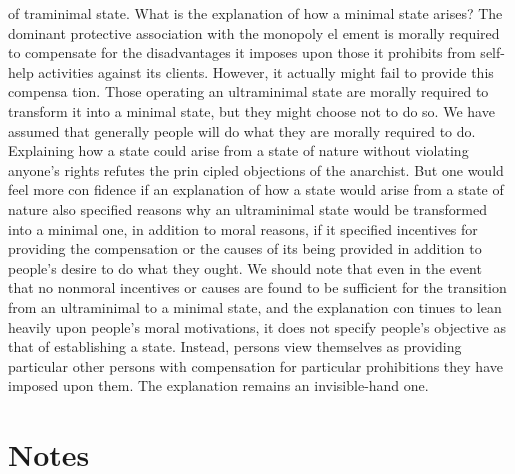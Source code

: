 \documentclass[11pt,openany]{book}
\newcommand{\booknoteshead}{%
  \phantomsection\section*{Notes}%
  \addcontentsline{toc}{section}{Notes}\markright{Notes}}
\begin{document}
of traminimal state. What is the explanation of how a minimal state arises? The dominant protective association with the monopoly el ement is morally required to compensate for the disadvantages it imposes upon those it prohibits from self-help activities against its clients. However, it actually might fail to provide this compensa tion. Those operating an ultraminimal state are morally required to transform it into a minimal state, but they might choose not to do so. We have assumed that generally people will do what they are morally required to do. Explaining how a state could arise from a state of nature without violating anyone's rights refutes the prin cipled objections of the anarchist. But one would feel more con fidence if an explanation of how a state would arise from a state of nature also specified reasons why an ultraminimal state would be transformed into a minimal one, in addition to moral reasons, if it specified incentives for providing the compensation or the causes of its being provided in addition to people's desire to do what they ought. We should note that even in the event that no nonmoral incentives or causes are found to be sufficient for the transition from an ultraminimal to a minimal state, and the explanation con tinues to lean heavily upon people's moral motivations, it does not specify people's objective as that of establishing a state. Instead, persons view themselves as providing particular other persons with compensation for particular prohibitions they have imposed upon them. The explanation remains an invisible-hand one. 

\booknoteshead
\end{document}
